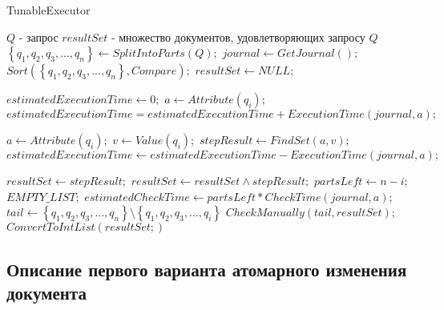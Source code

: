 \documentclass{matmex-diploma}
\begin{document}
        \begin{algorithm}[H]                   
        \caption{TunableExecutor}              
        \label{tunable}                        
            \begin{algorithmic}        
                \REQUIRE $Q$ - запрос
                \ENSURE $resultSet$ - множество документов, удовлетворяющих запросу $Q$
                \STATE $\left\{ q_1, q_2, q_3, ... , q_n \right\} \leftarrow SplitIntoParts(Q);$
                \STATE $journal \leftarrow GetJournal();$
                \STATE $Sort(\left\{ q_1, q_2, q_3, ... , q_n \right\}, Compare);$
                \STATE $resultSet \leftarrow NULL;$
                
                \STATE $estimatedExecutionTime \leftarrow 0;$
                    \STATE $a \leftarrow Attribute(q_i);$
                    \STATE $estimatedExecutionTime = estimatedExecutionTime + ExecutionTime(journal, a);$
                \ENDFOR
                
                    \STATE $a \leftarrow Attribute(q_i);$
                    \STATE $v \leftarrow Value(q_i);$
                    \STATE $stepResult \leftarrow FindSet(a, v);$
                    \STATE $estimatedExecutionTime \leftarrow estimatedExecutionTime - ExecutionTime(journal, a);$
                    
                        \STATE $resultSet \leftarrow stepResult;$
                    \ELSE
                        \STATE $resultSet \leftarrow resultSet \land stepResult;$
                    \ENDIF
                    \STATE $partsLeft \leftarrow n - i;$
                        \RETURN $EMPTY\_LIST;$
                    \ENDIF
                    \STATE $estimatedCheckTime \leftarrow partsLeft * CheckTime(journal, a);$
                        \STATE $tail \leftarrow \left\{ q_1, q_2, q_3, ... , q_n \right\} \setminus \left\{ q_1, q_2, q_3, ... , q_i \right\}$
                        \RETURN $CheckManually(tail, resultSet);$
                    \ENDIF
                \ENDFOR
                \RETURN $ConvertToIntList(resultSet;)$
            \end{algorithmic}
        \end{algorithm}

    \subsection{Описание первого варианта атомарного изменения документа}
\end{document}
